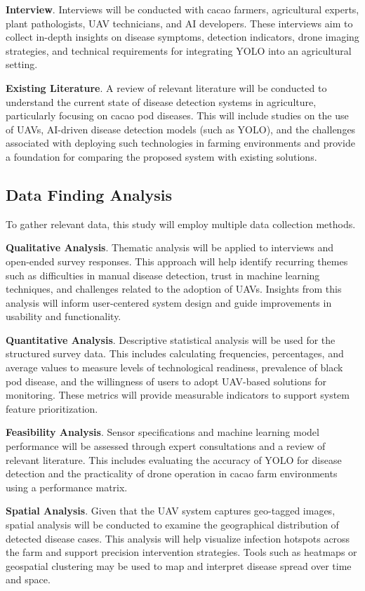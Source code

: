 	\textbf{Interview}. Interviews will be conducted with cacao farmers, agricultural experts, plant pathologists, UAV technicians, and AI developers. These interviews aim to collect in-depth insights on disease symptoms, detection indicators, drone imaging strategies, and technical requirements for integrating YOLO into an agricultural setting. 
	
	\textbf{Existing Literature}. A review of relevant literature will be conducted to understand the current state of disease detection systems in agriculture, particularly focusing on cacao pod diseases. This will include studies on the use of UAVs, AI-driven disease detection models (such as YOLO), and the challenges associated with deploying such technologies in farming environments and provide a foundation for comparing the proposed system with existing solutions.
	
	\subsection{Data Finding Analysis}
	
	To gather relevant data, this study will employ multiple data collection methods. 
	
	\textbf{Qualitative Analysis}. Thematic analysis will be applied to interviews and open-ended survey responses. This approach will help identify recurring themes such as difficulties in manual disease detection, trust in machine learning techniques, and challenges related to the adoption of UAVs. Insights from this analysis will inform user-centered system design and guide improvements in usability and functionality. 
	
	\textbf{Quantitative Analysis}. Descriptive statistical analysis will be used for the structured survey data. This includes calculating frequencies, percentages, and average values to measure levels of technological readiness, prevalence of black pod disease, and the willingness of users to adopt UAV-based solutions for monitoring. These metrics will provide measurable indicators to support system feature prioritization. 
	
	
	\textbf{Feasibility Analysis}. Sensor specifications and machine learning model performance will be assessed through expert consultations and a review of relevant literature. This includes evaluating the accuracy of YOLO for disease detection and the practicality of drone operation in cacao farm environments using a performance matrix. 
	
	\textbf{Spatial Analysis}. Given that the UAV system captures geo-tagged images, spatial analysis will be conducted to examine the geographical distribution of detected disease cases. This analysis will help visualize infection hotspots across the farm and support precision intervention strategies. Tools such as heatmaps or geospatial clustering may be used to map and interpret disease spread over time and space.
	
